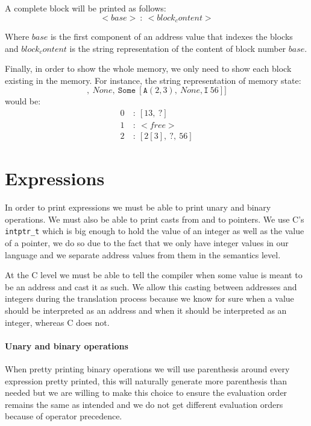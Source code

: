 A complete block will be printed as follows:
\begin{equation*}
<base>\ :\ <block_content> 
\end{equation*}

Where $base$ is the first component of an address value that indexes the blocks and $block_content$ is the string representation of the content of block number $base$.

Finally, in order to show the whole memory, we only need to show each block existing in the memory.
For instance, the string representation of memory state:
\begin{equation*}
[\mathtt{Some}\ [\mathtt{I}\ 13,\ \mathtt{None}],\ None,\ \mathtt{Some}\ [\mathtt{A}(2,3),\ None, \mathtt{I}\ 56]]
\end{equation*}
would be:
\begin{align*}
0\ &:\ [13,\ ?] \\
1\ &:\ <free> \\
2\ &:\ [2[3],\ ?,\ 56]
\end{align*}


\section{Expressions}
In order to print expressions we must be able to print unary and binary operations.
We must also be able to print casts from and to pointers.
We use C's \verb|intptr_t| which is big enough to hold the value of an integer as well as the value of a pointer, we do so due to the fact that we only have integer values in our language and we separate address values from them in the semantics level.

At the C level we must be able to tell the compiler when some value is meant to be an address and cast it as such.
We allow this casting between addresses and integers during the translation process because we know for sure when a value should be interpreted as an address and when it should be interpreted as an integer, whereas C does not.

\paragraph{Unary and binary operations}
When pretty printing binary operations we will use parenthesis around every expression pretty printed, this will naturally generate more parenthesis than needed but we are willing to make this choice to ensure the evaluation order remains the same as intended and we do not get different evaluation orders because of operator precedence.

